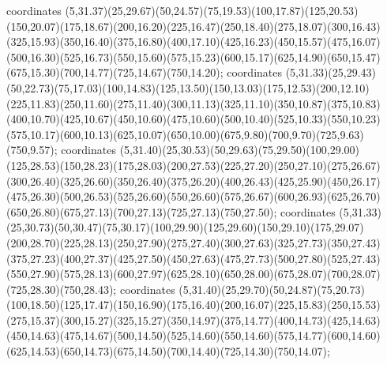  coordinates {(5,31.37)(25,29.67)(50,24.57)(75,19.53)(100,17.87)(125,20.53)(150,20.07)(175,18.67)(200,16.20)(225,16.47)(250,18.40)(275,18.07)(300,16.43)(325,15.93)(350,16.40)(375,16.80)(400,17.10)(425,16.23)(450,15.57)(475,16.07)(500,16.30)(525,16.73)(550,15.60)(575,15.23)(600,15.17)(625,14.90)(650,15.47)(675,15.30)(700,14.77)(725,14.67)(750,14.20)};
 coordinates {(5,31.33)(25,29.43)(50,22.73)(75,17.03)(100,14.83)(125,13.50)(150,13.03)(175,12.53)(200,12.10)(225,11.83)(250,11.60)(275,11.40)(300,11.13)(325,11.10)(350,10.87)(375,10.83)(400,10.70)(425,10.67)(450,10.60)(475,10.60)(500,10.40)(525,10.33)(550,10.23)(575,10.17)(600,10.13)(625,10.07)(650,10.00)(675,9.80)(700,9.70)(725,9.63)(750,9.57)};
 coordinates {(5,31.40)(25,30.53)(50,29.63)(75,29.50)(100,29.00)(125,28.53)(150,28.23)(175,28.03)(200,27.53)(225,27.20)(250,27.10)(275,26.67)(300,26.40)(325,26.60)(350,26.40)(375,26.20)(400,26.43)(425,25.90)(450,26.17)(475,26.30)(500,26.53)(525,26.60)(550,26.60)(575,26.67)(600,26.93)(625,26.70)(650,26.80)(675,27.13)(700,27.13)(725,27.13)(750,27.50)};
 coordinates {(5,31.33)(25,30.73)(50,30.47)(75,30.17)(100,29.90)(125,29.60)(150,29.10)(175,29.07)(200,28.70)(225,28.13)(250,27.90)(275,27.40)(300,27.63)(325,27.73)(350,27.43)(375,27.23)(400,27.37)(425,27.50)(450,27.63)(475,27.73)(500,27.80)(525,27.43)(550,27.90)(575,28.13)(600,27.97)(625,28.10)(650,28.00)(675,28.07)(700,28.07)(725,28.30)(750,28.43)};
 coordinates {(5,31.40)(25,29.70)(50,24.87)(75,20.73)(100,18.50)(125,17.47)(150,16.90)(175,16.40)(200,16.07)(225,15.83)(250,15.53)(275,15.37)(300,15.27)(325,15.27)(350,14.97)(375,14.77)(400,14.73)(425,14.63)(450,14.63)(475,14.67)(500,14.50)(525,14.60)(550,14.60)(575,14.77)(600,14.60)(625,14.53)(650,14.73)(675,14.50)(700,14.40)(725,14.30)(750,14.07)};
